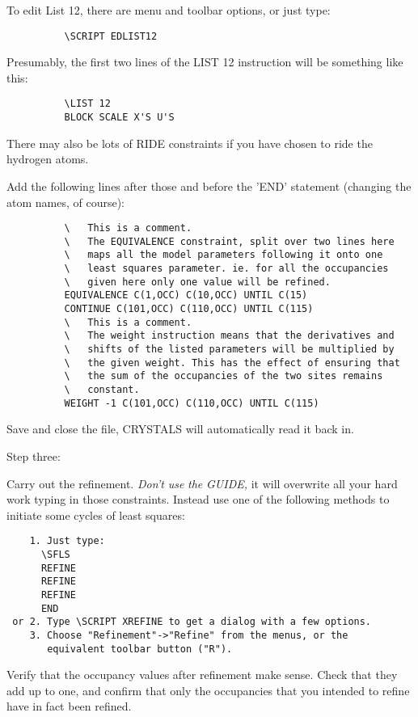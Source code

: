 \documentclass[10pt,a4paper]{report}
\begin{document}
To edit List 12, there are menu and toolbar options, or just type:
\small\begin{verbatim}
          \SCRIPT EDLIST12
\end{verbatim}\normalsize


Presumably, the first two lines of the LIST 12 instruction 
will be something like this:
\small\begin{verbatim}        
          \LIST 12
          BLOCK SCALE X'S U'S
\end{verbatim}\normalsize


There may also be lots of RIDE constraints if you have chosen to
ride the hydrogen atoms.


Add the following lines after those and before the 'END' statement 
(changing the atom names, of course):
\small\begin{verbatim}
          \   This is a comment.
          \   The EQUIVALENCE constraint, split over two lines here
          \   maps all the model parameters following it onto one
          \   least squares parameter. ie. for all the occupancies
          \   given here only one value will be refined.
          EQUIVALENCE C(1,OCC) C(10,OCC) UNTIL C(15)
          CONTINUE C(101,OCC) C(110,OCC) UNTIL C(115)
          \   This is a comment.
          \   The weight instruction means that the derivatives and
          \   shifts of the listed parameters will be multiplied by
          \   the given weight. This has the effect of ensuring that
          \   the sum of the occupancies of the two sites remains
          \   constant.
          WEIGHT -1 C(101,OCC) C(110,OCC) UNTIL C(115)
\end{verbatim}\normalsize


Save and close the file, CRYSTALS will automatically read it back in.


Step three:


Carry out the refinement. \emph{Don't} \emph{use} \emph{the} \emph{GUIDE,} it will overwrite
all your hard work typing in those constraints. Instead use one of the
following methods to initiate some cycles of least squares:
\small\begin{verbatim}
    1. Just type:
      \SFLS
      REFINE
      REFINE
      REFINE
      END
 or 2. Type \SCRIPT XREFINE to get a dialog with a few options.
    3. Choose "Refinement"->"Refine" from the menus, or the 
       equivalent toolbar button ("R").
\end{verbatim}\normalsize


Verify that the occupancy values after refinement make sense. Check
that they add up to one, and confirm that only the occupancies that
you intended to refine have in fact been refined.
\end{document}
